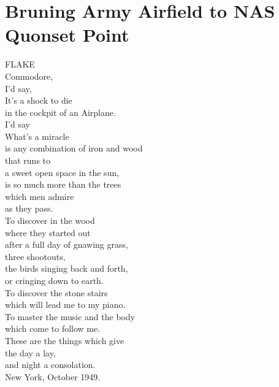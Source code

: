 \documentclass[smalldemyvopaper,11pt,twoside,onecolumn,openright,extrafontsizes]{memoir}
\begin{document}
\chapter{Bruning Army Airfield to NAS Quonset Point}
FLAKE
\\Commodore,
\\I'd say,
\\It's a shock to die
\\in the cockpit of an Airplane.
\\I'd say
\\What's a miracle
\\is any combination of iron and wood
\\that runs to
\\a sweet open space in the sun,
\\is so much more than the trees
\\which men admire
\\as they pass.
\\To discover in the wood
\\where they started out
\\after a full day of gnawing grass,
\\three shootouts,
\\the birds singing back and forth,
\\or cringing down to earth.
\\To discover the stone stairs
\\which will lead me to my piano.
\\To master the music and the body
\\which come to follow me.
\\These are the things which give
\\the day a lay,
\\and night a consolation.
\\New York, October 1949.
\end{document}

